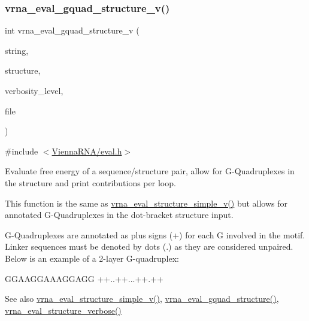 \subsubsection{\texorpdfstring{vrna\+\_\+eval\+\_\+gquad\+\_\+structure\+\_\+v()}{vrna\_eval\_gquad\_structure\_v()}}
{\footnotesize\ttfamily int vrna\+\_\+eval\+\_\+gquad\+\_\+structure\+\_\+v (\begin{DoxyParamCaption}\item[{const char $\ast$}]{string,  }\item[{const char $\ast$}]{structure,  }\item[{int}]{verbosity\+\_\+level,  }\item[{F\+I\+LE $\ast$}]{file }\end{DoxyParamCaption})}



{\ttfamily \#include $<$\hyperlink{eval_8h}{Vienna\+R\+N\+A/eval.\+h}$>$}



Evaluate free energy of a sequence/structure pair, allow for G-\/\+Quadruplexes in the structure and print contributions per loop. 

This function is the same as \hyperlink{group__eval_gacd6278343e77d13f1d53588e50d303bc}{vrna\+\_\+eval\+\_\+structure\+\_\+simple\+\_\+v()} but allows for annotated G-\/\+Quadruplexes in the dot-\/bracket structure input.

G-\/\+Quadruplexes are annotated as plus signs (\textquotesingle{}+\textquotesingle{}) for each G involved in the motif. Linker sequences must be denoted by dots (\textquotesingle{}.\textquotesingle{}) as they are considered unpaired. Below is an example of a 2-\/layer G-\/quadruplex\+: 
\begin{DoxyCode}
GGAAGGAAAGGAGG
++..++...++.++
\end{DoxyCode}


\begin{DoxySeeAlso}{See also}
\hyperlink{group__eval_gacd6278343e77d13f1d53588e50d303bc}{vrna\+\_\+eval\+\_\+structure\+\_\+simple\+\_\+v()}, \hyperlink{group__eval_ga3263504825ef4b523eba797c99921df4}{vrna\+\_\+eval\+\_\+gquad\+\_\+structure()}, \hyperlink{group__eval_ga0928d699d310178f84ee2351034e5cb5}{vrna\+\_\+eval\+\_\+structure\+\_\+verbose()}
\end{DoxySeeAlso}

